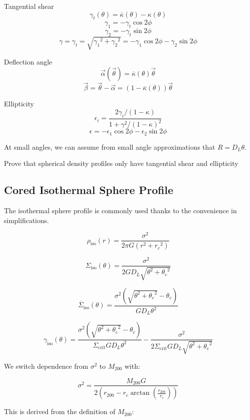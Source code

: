 \documentclass[10pt]{article}
\begin{document}
Tangential shear
\[\gamma_t(\theta) = \overline{\kappa}(\theta) - \kappa(\theta)\]
\[\gamma_1 = -\gamma_t \cos{2\phi}\]
\[\gamma_2 = -\gamma_t \sin{2\phi}\]
\[\gamma = \gamma_t = \sqrt{{\gamma_1}^2 + {\gamma_2}^2} = -\gamma_1 \cos{2\phi} -\gamma_2 \sin{2\phi}\]

Deflection angle
\[\vec{\alpha}(\vec{\theta}) = \overline{\kappa}(\theta)\vec{\theta}\]
\[\vec{\beta} = \vec{\theta} - \vec{\alpha} = (1 - \overline{\kappa}(\theta))\vec{\theta} \]

Ellipticity
\[\epsilon_i = \frac{2 \gamma_i/(1 - \kappa)}{1 + \gamma^2/(1 - \kappa)^2}\]
\[\epsilon =  -\epsilon_1 \cos{2\phi} -\epsilon_2 \sin{2\phi}\]

At small angles, we can assume from small angle approximations that $R = D_L \theta$.

Prove that spherical density profiles only have tangential shear and ellipticity


\subsection{Cored Isothermal Sphere Profile}

The isothermal sphere profile is commonly used thanks to the convenience in simplifications.

\[\rho_\mathrm{iso}(r) = \frac{\sigma^2}{2\pi G (r^2 + {r_c}^2)}\]

%
%

\[\Sigma_\mathrm{iso}(\theta) = \frac{\sigma^2}{2 G D_L \sqrt{\theta^2 + {\theta_c}^2}}\]

\[\overline{\Sigma}_\mathrm{iso}(\theta) = \frac{\sigma^2 \left(\sqrt{\theta^2 + {\theta_c}^2} - \theta_c \right)}{G D_L \theta^2}\]

\[\gamma_\mathrm{iso}(\theta) = \frac{\sigma^2 \left(\sqrt{\theta^2 + {\theta_c}^2} - \theta_c \right)}{\Sigma_\mathrm{crit} G D_L \theta^2} - \frac{\sigma^2}{2 \Sigma_\mathrm{crit} G D_L \sqrt{\theta^2 + {\theta_c}^2}}\]

We switch dependence from $\sigma^2$ to $M_{200}$ with:

\[\sigma^2 = \frac{M_{200} G}{2 \left( r_{200} - r_c \arctan{\left(\frac{r_{200}}{r_c}\right)} \right)}\]

This is derived from the definition of $M_{200}$:
\end{document}
